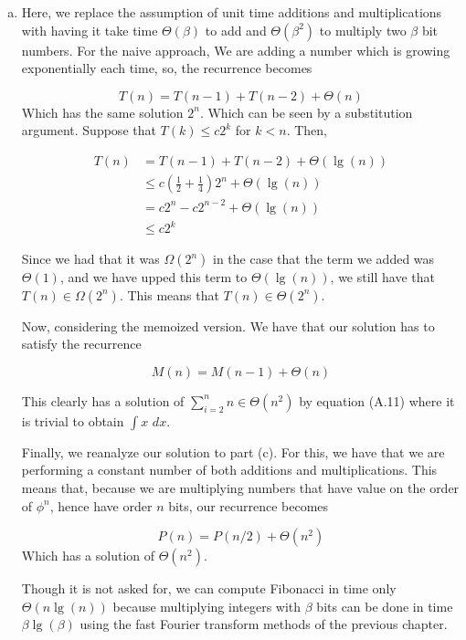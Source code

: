 \documentclass{article}
\begin{document}
\begin{enumerate}[a.]
\item
Here, we replace the assumption of unit time additions and multiplications with having it take time $\Theta(\beta)$ to add and $\Theta(\beta^2)$ to multiply two $\beta$ bit numbers. For the naive approach, We are adding a number which is growing exponentially each time, so, the recurrence becomes 

\[
T(n) = T(n-1) + T(n-2) + \Theta(n)
\]
Which has the same solution $2^n$. Which can be seen by a substitution argument. Suppose that $T(k) \le c 2^k$ for $k<n$. Then,

\begin{align*}
T(n) &= T(n-1) +T(n-2) + \Theta(\lg(n))\\
&\le c(\frac{1}{2} + \frac{1}{4})2^n + \Theta(\lg(n))\\
&= c2^n - c2^{n-2} + \Theta(\lg(n))\\
&\le c2^k
\end{align*}

Since we had that it was $\Omega(2^n)$ in the case that the term we added was $\Theta(1)$, and we have upped this term to $\Theta(\lg(n))$, we still have that $T(n)\in \Omega(2^n)$. This means that $T(n) \in \Theta(2^n)$.


Now, considering the memoized version. We have that our solution has to satisfy the recurrence

\[
M(n) = M(n-1) + \Theta(n)
\]

This clearly has a solution of $\sum_{i=2}^n n \in\Theta(n^2)$ by equation (A.11) where it is trivial to obtain $\int x\,\,dx$. 

Finally, we reanalyze our solution to part (c). For this, we have that we are performing a constant number of both additions and multiplications. This means that, because we are multiplying numbers that have value on the order of $\phi^n$, hence have order $n$ bits,  our recurrence becomes

\[
P(n) = P(n/2) + \Theta(n^2)
\]
Which has a solution of $\Theta(n^2)$.


Though it is not asked for, we can compute Fibonacci in time only $\Theta(n\lg(n))$ because multiplying integers with $\beta$ bits can be done in time $\beta\lg(\beta)$ using the fast Fourier transform methods of the previous chapter.

\end{enumerate}
\end{document}
